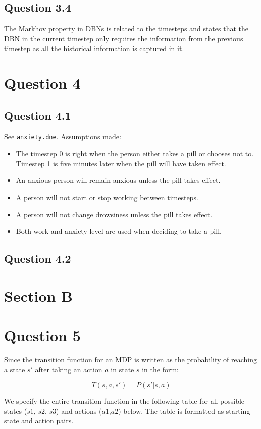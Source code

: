 \documentclass[12pt,notitlepage]{article}
\newcommand{\question}{\section*}
\begin{document}
\subsection*{Question 3.4}

The Markhov property in DBNs is related to the timesteps and states that the DBN
in the current timestep only requires the information from the previous timestep
as all the historical information is captured in it.

\question{Question 4}

\subsection*{Question 4.1}

See \texttt{anxiety.dne}. Assumptions made:
\begin{itemize}
    \item The timestep 0 is right when the person either takes a pill or chooses
        not to. Timestep 1 is five minutes later when the pill will have taken
        effect.
    \item An anxious person will remain anxious unless the pill takes effect.
    \item A person will not start or stop working between timesteps.
    \item A person will not change drowsiness unless the pill takes effect.
    \item Both work and anxiety level are used when deciding to take a pill.
\end{itemize}


\subsection*{Question 4.2}


\section*{Section B}
\question{Question 5}

Since the transition function for an MDP is written as the probability of reaching a state $s'$ after taking an action $a$ in state $s$ in the form:

$$T(s,a,s') = P(s' | s, a)$$

We specify the entire transition function in the following table for all
possible states ($s1$, $s2$, $s3$) and actions ($a1$,$a2$) below. The table is
formatted as starting state and action pairs.
\end{document}
